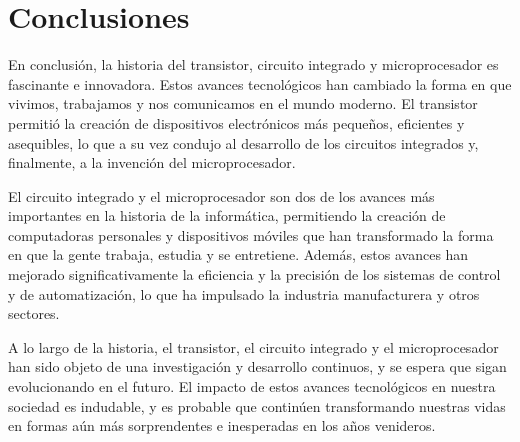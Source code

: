 \documentclass{article}
\begin{document}
\section*{Conclusiones}

En conclusión, la historia del transistor, circuito integrado y microprocesador es fascinante e innovadora. 
Estos avances tecnológicos han cambiado la forma en que vivimos, trabajamos y nos comunicamos en el mundo moderno. 
El transistor permitió la creación de dispositivos electrónicos más pequeños, eficientes y asequibles, 
lo que a su vez condujo al desarrollo de los circuitos integrados y, finalmente, a la invención del microprocesador.

El circuito integrado y el microprocesador son dos de los avances más importantes en la historia de la informática, 
permitiendo la creación de computadoras personales y dispositivos móviles que han transformado la forma en que la gente trabaja, 
estudia y se entretiene. Además, estos avances han mejorado significativamente la eficiencia y la precisión de los sistemas de control 
y de automatización, lo que ha impulsado la industria manufacturera y otros sectores.

A lo largo de la historia, el transistor, el circuito integrado y el microprocesador han sido objeto de una investigación 
y desarrollo continuos, y se espera que sigan evolucionando en el futuro. El impacto de estos avances tecnológicos 
en nuestra sociedad es indudable, y es probable que continúen transformando nuestras vidas 
en formas aún más sorprendentes e inesperadas en los años venideros.
\end{document}
